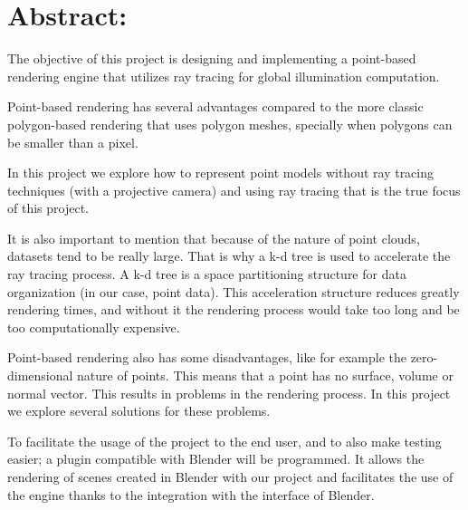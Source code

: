 %
%

\section*{Abstract:}

The objective of this project is designing and implementing a point-based rendering engine that utilizes ray tracing for global illumination computation. 

Point-based rendering has several advantages compared to the more classic polygon-based rendering that uses polygon meshes, specially when polygons can be smaller than a pixel.

In this project we explore how to represent point models without ray tracing techniques (with a projective camera) and using ray tracing that is the true focus of this project.

It is also important to mention that because of the nature of point clouds, datasets tend to be really large. That is why a k-d tree is used to accelerate the ray tracing process. A k-d tree is a space partitioning structure for data organization (in our case, point data). This acceleration structure reduces greatly rendering times, and without it the rendering process would take too long and be too computationally expensive.

Point-based rendering also has some disadvantages, like for example the zero-dimensional nature of points. This means that a point has no surface, volume or normal vector. This results in problems in the rendering process. In this project we explore several solutions for these problems.

To facilitate the usage of the project to the end user, and to also make testing easier; a plugin compatible with Blender will be programmed. It allows the rendering of scenes created in Blender with our project and facilitates the use of the engine thanks to the integration with the interface of Blender. 



